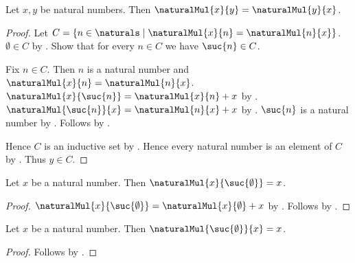 \begin{theorem}\label{natural_multiplication_commutative}
    Let $x,y$ be natural numbers.
    Then $\naturalMul{x}{y}=\naturalMul{y}{x}$.
\end{theorem}
\begin{proof}
    Let $C=\{n\in\naturals\mid
        \text{$\naturalMul{x}{n}=\naturalMul{n}{x}$}\}$.
    $\emptyset\in C$
        by .
    Show that for every $n\in C$ we have $\suc{n}\in C$.
    \begin{subproof}
        Fix $n\in C$.
        Then $n$ is a natural number and
            $\naturalMul{x}{n}=\naturalMul{n}{x}$.
        $\naturalMul{x}{\suc{n}}=\naturalMul{x}{n}+x$
            by .
        $\naturalMul{\suc{n}}{x}=\naturalMul{n}{x}+x$
            by .
        $\suc{n}$ is a natural number by .
        Follows by
            .
    \end{subproof}
    Hence $C$ is an inductive set by .
    Hence every natural number is an element of $C$
        by .
    Thus $y\in C$.
\end{proof}

\begin{proposition}\label{natural_multiplication_one_right}
    Let $x$ be a natural number.
    Then $\naturalMul{x}{\suc{\emptyset}}=x$.
\end{proposition}
\begin{proof}
    $\naturalMul{x}{\suc{\emptyset}}
        =\naturalMul{x}{\emptyset}+x$
        by .
    Follows by
        .
\end{proof}

\begin{proposition}\label{natural_multiplication_one_left}
    Let $x$ be a natural number.
    Then $\naturalMul{\suc{\emptyset}}{x}=x$.
\end{proposition}
\begin{proof}
    Follows by
        .
\end{proof}

